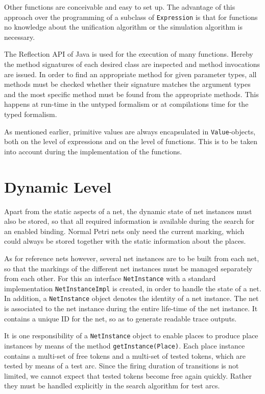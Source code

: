 Other functions are conceivable and easy to set up. The advantage of this
approach over the programming of a subclass of \texttt{Expression} is that for
functions no knowledge about the unification algorithm or the simulation
algorithm is necessary.

The Reflection API of Java is used for the execution of many functions. Hereby
the method signatures of each desired class are inspected and method
invocations are issued. In order to find an appropriate method for given
parameter types, all methods must be checked whether their signature matches
the argument types and the most specific method must be found from the 
appropriate methods. This happens at run-time in the untyped formalism 
or at compilations time for the typed formalism.

As mentioned earlier, primitive values are always encapsulated
in \texttt{Value}-objects, both on the level of expressions and
on the level of functions. 
This is to be taken into account during the implementation of the functions.


\section{Dynamic Level}

Apart from the static aspects of a net, the dynamic state
of net instances must also be
stored, so that all required information is available
during the search for an enabled binding.
Normal Petri nets only need the current marking,
which could always be stored together with the static
information about the places.


As for reference nets however, several net instances are to be built from
each net, so that the markings of the different net instances must be managed
separately from each other. For this an interface \texttt{NetInstance} with a
standard implementation \texttt{NetInstanceImpl} 
is created, in order to handle the state of a net. 
In addition, a \texttt{NetInstance} object denotes the identity of
a net instance. The net is associated to the net instance during the
entire life-time of the net instance. It contains a unique ID
for the net, so as to generate readable trace outputs.

It is one responsibility of a \texttt{NetInstance} object to enable
places to produce place instances by means of the method
\texttt{getInstance(Place)}. Each place instance contains a multi-set of free
tokens and a multi-set of tested tokens, which are tested by means of a
test arc. Since the firing duration of transitions is not limited, we
cannot expect that tested tokens become free again quickly. Rather they
must be handled explicitly in the search algorithm for test arcs.

